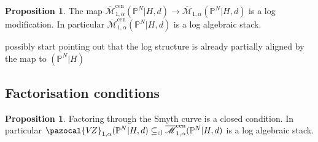 \documentclass[11pt]{amsart}
\newcommand{\oM}{\overline{\mathcal{M}}}
\newcommand{\PP}{\mathbb P}
\newcommand{\VZ}{\pazocal{V\!Z}}
\renewcommand{\to}{\rightarrow}
\theoremstyle{definition}
\newtheorem{prop}[thm]{Proposition}
\theoremstyle{definition}
\begin{document}
\begin{prop}
 The map $\oM_{1,\alpha}^{\mathrm{cen}}(\PP^N|H,d)\to\oM_{1,\alpha}(\PP^N|H,d)$ is a log modification. In particular $\oM_{1,\alpha}^{\mathrm{cen}}(\PP^N|H,d)$ is a log algebraic stack.
\end{prop}

{\color{gray} possibly start pointing out that the log structure is already partially aligned by the map to $(\PP^N|H)$}

\subsection{Factorisation conditions}

\begin{prop}
 Factoring through the Smyth curve is a closed condition. In particular $\VZ_{1,\alpha}(\PP^N|H,d)\subseteq_{\mathrm{cl}}\oM_{1,\alpha}^{\mathrm{cen}}(\PP^N|H,d)$ is a log algebraic stack.
\end{prop}
\end{document}
